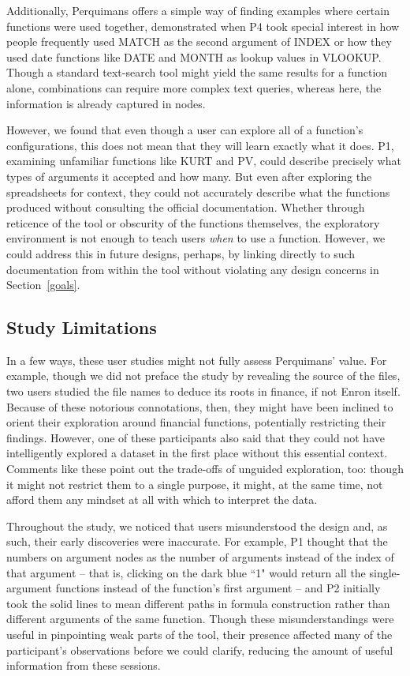 \documentclass[conference]{IEEEtran}
\newcommand{\toolname}{Perquimans\xspace} \newcommand{\toolnameend}{Perquimans}
\newcommand{\toolnameposs}{Perquimans' }
\begin{document}
	Additionally, \toolname offers a simple way of finding examples where certain
	functions were used together, demonstrated when P4 took special interest in how
	people frequently used MATCH as the second argument of INDEX or how they used
	date functions like DATE and MONTH as lookup values in VLOOKUP. Though a
	standard text-search tool might yield the same results for a function alone,
	combinations can require more complex text queries, whereas here, the
	information is already captured in nodes. 
	
	However, we found that even though a user can explore all of a function's
	configurations, this does not mean that they will learn exactly what it does.
	P1, examining unfamiliar functions like KURT and PV, could describe precisely
	what types of arguments it accepted and how many. But even after exploring the
	spreadsheets for context, they could not accurately describe what the functions
	produced without consulting the official documentation. Whether through
	reticence of the tool or obscurity of the functions themselves, the exploratory
	environment is not enough to teach users \textit{when} to use a function.
	However, we could address this in future designs, perhaps, by linking directly
	to such documentation from within the tool without violating any design
	concerns in Section~\ref{goals}. 
	
	\subsection{Study Limitations} \label{subsec:studylimitations} 
	
	In a few ways, these user studies might not fully assess \toolnameposs value.
	For example, though we did not preface the study by revealing the source of the
	files, two users studied the file names to deduce its roots in finance, if not
	Enron itself. Because of these notorious connotations, then, they might have
	been inclined to orient their exploration around financial functions,
	potentially restricting their findings. However, one of these participants also
	said that they could not have intelligently explored a dataset in the first
	place without this essential context. Comments like these point out the
	trade-offs of unguided exploration, too: though it might not restrict them to a
	single purpose, it might, at the same time, not afford them any mindset at all
	with which to interpret the data. 
	
	Throughout the study, we noticed that users misunderstood the design
	and, as such, their early discoveries were inaccurate. For example, P1
	thought that the numbers on argument nodes as the number of arguments instead
	of the index of that argument -- that is, clicking on the dark blue
	``1" would return all the single-argument functions instead of the function's
	first argument -- and P2 initially took the solid lines to mean
	different paths in formula construction rather than different arguments of the
	same function. Though these misunderstandings were useful in pinpointing weak
	parts of the tool, their presence affected many of the participant's observations before we
	could clarify, reducing the amount of useful information from these sessions.
	
\end{document}
